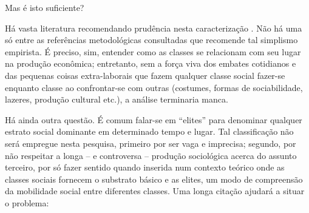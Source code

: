 Mas é isto suficiente?

Há vasta literatura recomendando prudência nesta caracterização \cite{aguiar_hierarquias_1974, BERNARDO1991, bernardo_fascismo_2015, ossowski_classes_1964, schumpeter_imperialismo_1961, velho_classes_1977}. Não há uma só entre as referências metodológicas consultadas que recomende tal simplismo empirista. É preciso, sim, entender como as classes se relacionam com seu lugar na produção econômica; entretanto, sem a força viva dos embates cotidianos e das pequenas coisas extra-laborais que fazem qualquer classe social fazer-se enquanto classe ao confrontar-se com outras (costumes, formas de sociabilidade, lazeres, produção cultural etc.), a análise terminaria manca.

Há ainda outra questão. É comum falar-se em ``elites'' para denominar qualquer estrato social dominante em determinado tempo e lugar. Tal classificação não será empregue nesta pesquisa, primeiro por ser vaga e imprecisa; segundo, por não respeitar a longa -- e controversa -- produção sociológica acerca do assunto \cite{bottomore_elites_1965,michels_partidos_1982,mosca_elementi_1923,pareto_mind_1935,
schumpeter_capitalismo_1961} terceiro, por só fazer sentido quando inserida num contexto teórico onde as classes sociais fornecem o substrato básico e as elites, um modo de compreensão da mobilidade social entre diferentes classes. Uma longa citação ajudará a situar o problema:

